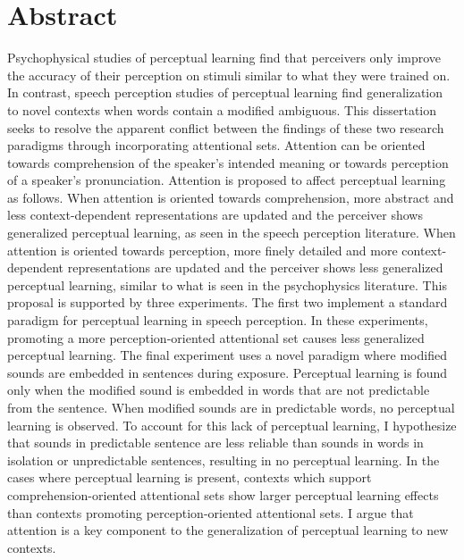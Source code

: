 
\chapter{Abstract}

Psychophysical studies of perceptual learning find that perceivers only improve the accuracy of their perception on stimuli similar to what they were trained on.
In contrast, speech perception studies of perceptual learning find generalization to novel contexts when words contain a modified ambiguous.
This dissertation seeks to resolve the apparent conflict between the findings of these two research paradigms through incorporating attentional sets.
Attention can be oriented towards comprehension of the speaker's intended meaning or towards perception of a speaker's pronunciation.
Attention is proposed to affect perceptual learning as follows.
When attention is oriented towards comprehension, more abstract and less context-dependent representations are updated and the perceiver shows generalized perceptual learning, as seen in the speech perception literature.
When attention is oriented towards perception, more finely detailed and more context-dependent representations are updated and the perceiver shows less generalized perceptual learning, similar to what is seen in the psychophysics literature.
This proposal is supported by three experiments.
The first two implement a standard paradigm for perceptual learning in speech perception.
In these experiments, promoting a more perception-oriented attentional set causes less generalized perceptual learning.
The final experiment uses a novel paradigm where modified sounds are embedded in sentences during exposure.
Perceptual learning is found only when the modified sound is embedded in words that are not predictable from the sentence.
When modified sounds are in predictable words, no perceptual learning is observed.
To account for this lack of perceptual learning, I hypothesize that sounds in predictable sentence are less reliable than sounds in words in isolation or unpredictable sentences, resulting in no perceptual learning.
In the cases where perceptual learning is present, contexts which support comprehension-oriented attentional sets show larger perceptual learning effects than contexts promoting perception-oriented attentional sets.
I argue that attention is a key component to the generalization of perceptual learning to new contexts.


